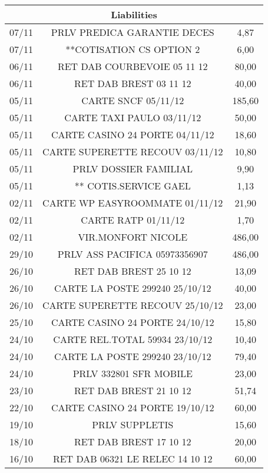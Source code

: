 \begin{tabular}{|c|c|c|}
\hline
\multicolumn{3}{|c|}{Liabilities} \\
\hline
07/11 & PRLV   PREDICA GARANTIE DECES & 4,87 \\
\hline
07/11 & **COTISATION CS OPTION 2 & 6,00 \\
\hline
06/11 & RET DAB COURBEVOIE     05 11 12 & 80,00 \\
\hline
06/11 & RET DAB BREST          03 11 12 & 40,00 \\
\hline
05/11 & CARTE SNCF             05/11/12 & 185,60 \\
\hline
05/11 & CARTE TAXI PAULO       03/11/12 & 50,00 \\
\hline
05/11 & CARTE CASINO 24 PORTE  04/11/12 & 18,60 \\
\hline
05/11 & CARTE SUPERETTE RECOUV 03/11/12 & 10,80 \\
\hline
05/11 & PRLV   DOSSIER FAMILIAL & 9,90 \\
\hline
05/11 & ** COTIS.SERVICE GAEL & 1,13 \\
\hline
02/11 & CARTE WP EASYROOMMATE  01/11/12 & 21,90 \\
\hline
02/11 & CARTE RATP             01/11/12 & 1,70 \\
\hline
02/11 & VIR.MONFORT NICOLE & 486,00 \\
\hline
29/10 & PRLV   ASS PACIFICA  05973356907 & 486,00 \\
\hline
26/10 & RET DAB BREST          25 10 12 & 13,09 \\
\hline
26/10 & CARTE LA POSTE 299240  25/10/12 & 40,00 \\
\hline
26/10 & CARTE SUPERETTE RECOUV 25/10/12 & 23,00 \\
\hline
25/10 & CARTE CASINO 24 PORTE  24/10/12 & 15,80 \\
\hline
24/10 & CARTE REL.TOTAL 59934  23/10/12 & 10,40 \\
\hline
24/10 & CARTE LA POSTE 299240  23/10/12 & 79,40 \\
\hline
24/10 & PRLV 332801   SFR MOBILE & 23,00 \\
\hline
23/10 & RET DAB BREST          21 10 12 & 51,74 \\
\hline
22/10 & CARTE CASINO 24 PORTE  19/10/12 & 60,00 \\
\hline
19/10 & PRLV   SUPPLETIS & 15,60 \\
\hline
18/10 & RET DAB BREST          17 10 12 & 20,00 \\
\hline
16/10 & RET DAB 06321 LE RELEC 14 10 12 & 60,00 \\

\end{tabular}
